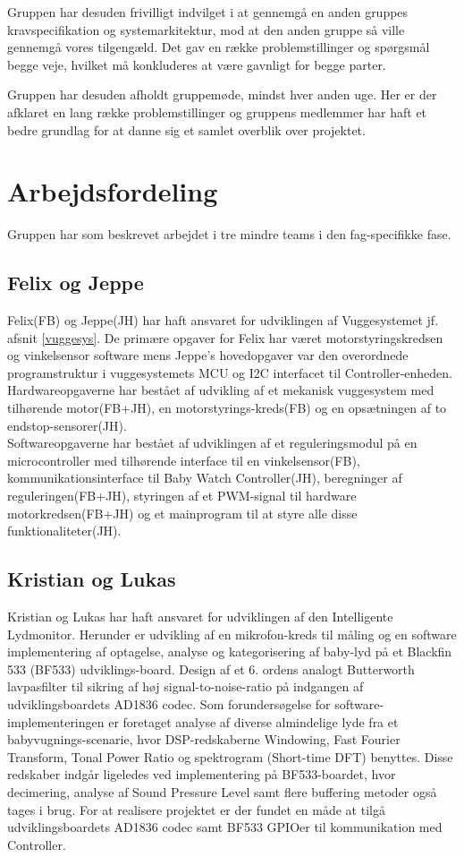 Gruppen har desuden frivilligt indvilget i at gennemgå en anden gruppes kravspecifikation og systemarkitektur, mod at den anden gruppe så ville gennemgå vores tilgengæld. Det gav en række problemstillinger og spørgsmål begge veje, hvilket må konkluderes at være gavnligt for begge parter.

Gruppen har desuden afholdt gruppemøde, mindst hver anden uge. Her er der afklaret en lang række problemstillinger og gruppens medlemmer har haft et bedre grundlag for at danne sig et samlet overblik over projektet. 

\section{Arbejdsfordeling}

Gruppen har som beskrevet arbejdet i tre mindre teams i den fag-specifikke fase. 

\subsection*{Felix og Jeppe}
Felix(FB) og Jeppe(JH) har haft ansvaret for udviklingen af Vuggesystemet jf. afsnit \vref{vuggesys}. De primære opgaver for Felix har været motorstyringskredsen og vinkelsensor software mens Jeppe's hovedopgaver var den overordnede programstruktur i vuggesystemets MCU og I2C interfacet til Controller-enheden.\\ 
Hardwareopgaverne har bestået af udvikling af et mekanisk vuggesystem med tilhørende motor(FB+JH), en motorstyrings-kreds(FB) og en opsætningen af to endstop-sensorer(JH).\\
Softwareopgaverne har bestået af udviklingen af et reguleringsmodul på en microcontroller med tilhørende interface til en vinkelsensor(FB), kommunikationsinterface til Baby Watch Controller(JH), beregninger af reguleringen(FB+JH), styringen af et PWM-signal til hardware motorkredsen(FB+JH) og et mainprogram til at styre alle disse funktionaliteter(JH). \\

\subsection*{Kristian og Lukas}
Kristian og Lukas har haft ansvaret for udviklingen af den Intelligente Lydmonitor. Herunder er udvikling af en mikrofon-kreds til måling  og en software implementering af optagelse, analyse og kategorisering af baby-lyd på et Blackfin 533 (BF533) udviklings-board. Design af et 6. ordens analogt Butterworth lavpasfilter til sikring af høj signal-to-noise-ratio på indgangen af udviklingsboardets AD1836 codec. Som forundersøgelse for software-implementeringen er foretaget analyse af diverse almindelige lyde fra et babyvugnings-scenarie, hvor DSP-redskaberne Windowing, Fast Fourier Transform, Tonal Power Ratio og spektrogram (Short-time DFT) benyttes. Disse redskaber indgår ligeledes ved implementering på BF533-boardet, hvor decimering, analyse af Sound Pressure Level samt flere buffering metoder også tages i brug. For at realisere projektet er der fundet en måde at tilgå udviklingsboardets AD1836 codec samt BF533 GPIOer til kommunikation med Controller.  \\

